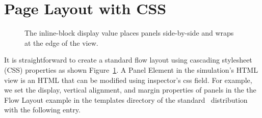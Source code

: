    \section{Page Layout with CSS}\label{section:04PageLayout}
\begin{figure}[htb]
  \centering
  \caption{The inline-block display value places panels side-by-side and wraps at the edge of the view.}
  \label{fig:04JavatoJS/Flow}
\end{figure}

It is straightforward to create a standard flow layout using cascading stylesheet (CSS) properties as shown Figure~\ref{fig:04JavatoJS/Flow}.  A Panel Element in the simulation's HTML view is an HTML  that can be modified using inspector's css field. For example, we set the display, vertical alignment, and margin properties of panels in the the Flow Layout example in the templates directory of the standard \ejs\ distribution with the following entry.

